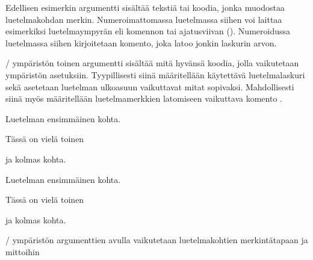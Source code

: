 Edellisen esimerkin argumentti  sisältää tekstiä tai
koodia, jonka muodostaa luetelmakohdan merkin. Numeroimattomassa
luetelmassa siihen voi laittaa esimerkiksi luetelmaympyrän eli komennon
 tai ajatusviivan (\koodi{--}). Numeroidussa
luetelmassa siihen kirjoitetaan komento, joka latoo jonkin laskurin
arvon.

\-/ ympäristön toinen argumentti 
sisältää mitä hyvänsä koodia, jolla vaikutetaan ympäristön asetuksiin.
Tyypillisesti siinä määritellään käytettävä luetelmalaskuri sekä
asetetaan luetelman ulkoasuun vaikuttavat mitat sopivaksi. Mahdollisesti
siinä myös määritellään luetelmamerkkien latomiseen vaikuttava komento
.

\begin{esimerkki*}

\begin{koodilohko}
\begin{list}{)}{
    \setlength{\leftmargin}{1.5em} %
    \setlength{\itemsep}{.2ex}     %
    \setlength{\parsep}{0ex}       %
  }
\item Luetelman ensimmäinen kohta.
\item Tässä on vielä toinen
\item ja kolmas kohta.
\end{list}
\end{koodilohko}
  \begin{tulos}
    \vspace*{-1.7ex}%
    \begin{list}{)}{
        \setlength{\leftmargin}{1.5em} %
        \setlength{\itemsep}{.2ex}     %
        \setlength{\parsep}{0ex}       %
      }
    \item Luetelman ensimmäinen kohta.
    \item Tässä on vielä toinen
    \item ja kolmas kohta.
    \end{list}
  \end{tulos}
  \caption{\-/ ympäristön argumenttien avulla vaikutetaan
    luetelmakohtien merkintätapaan ja mittoihin}
  \label{esim/list-perus}
\end{esimerkki*}


